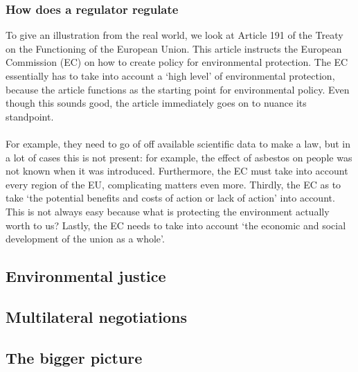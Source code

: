 \documentclass[../summary.tex]{subfiles}
\begin{document}
		\subsubsection{How does a regulator regulate}
			To give an illustration from the real world, we look at Article 191 of the Treaty on the Functioning of the European Union. This article instructs the European Commission (EC) on how to create policy for environmental protection. The EC essentially has to take into account a `high level' of environmental protection, because the article functions as the starting point for environmental policy. Even though this sounds good, the article immediately goes on to nuance its standpoint.\\
			\\
			 For example, they need to go of off available scientific data to make a law, but in a lot of cases this is not present: for example, the effect of asbestos on people was not known when it was introduced.  Furthermore, the EC must take into account every region of the EU, complicating matters even more. Thirdly, the EC as to take `the potential benefits and costs of action or lack of action' into account. This is not always easy because what is protecting the environment actually worth to us? Lastly, the EC needs to take into account `the economic and social development of the union as a whole'.
	
	\subsection{Environmental justice}
	
	\subsection{Multilateral negotiations}
	
	\subsection{The bigger picture}
\end{document}
